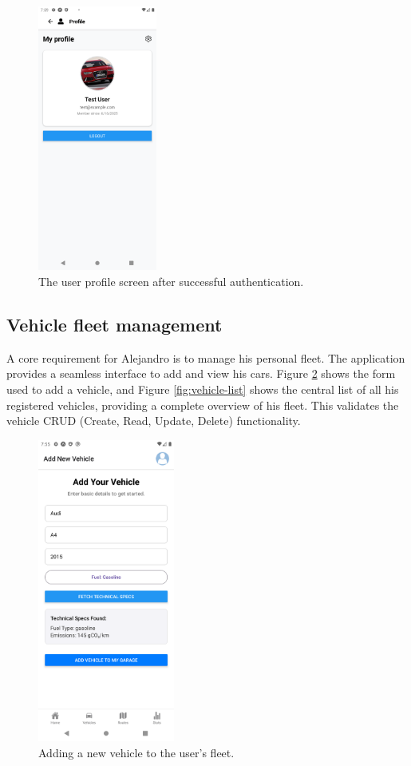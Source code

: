\begin{figure}[H]
    \centering
    \includegraphics[width=0.35\textwidth]{images/mobile/profile.png}
    \caption{The user profile screen after successful authentication.}
    \label{fig:profile-screen}
\end{figure}


\subsection{Vehicle fleet management}
A core requirement for Alejandro is to manage his personal fleet. The application provides a seamless interface to add and view his cars. Figure \ref{fig:add-vehicle} shows the form used to add a vehicle, and Figure \ref{fig:vehicle-list} shows the central list of all his registered vehicles, providing a complete overview of his fleet. This validates the vehicle CRUD (Create, Read, Update, Delete) functionality.

\begin{figure}[H]
    \centering
    \includegraphics[width=0.4\textwidth]{images/mobile/vehicle-add-2.png}
    \caption{Adding a new vehicle to the user's fleet.}
    \label{fig:add-vehicle}
\end{figure}

